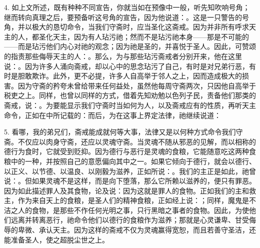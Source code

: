 4. 如上文所述，既有种种不同宣告，你就当如在预像中一般，听先知吹响号角；继而转向真理之后，要预备听这号角的宣告，因为他说道：。这是一只警告的号角，并以极大的恳切命令，当我们守斋时，应当圣化这斋戒。因为并非所有呼求天主的人，都圣化天主，因为有人玷污祂；然而不是玷污祂本身——那是不可能的——而是玷污他们内心对祂的观念；因为祂是圣的，并喜悦于圣人。因此，可赞颂的指责那些侮辱天主的人：。那么，为与那些玷污斋戒者分别开来，他在这里说：。因为许多人涌向斋戒，却以心中的思念玷污了自己，有时是对兄弟行恶，有时是胆敢欺诈。此外，更不必提，许多人自高举于邻人之上，因而造成极大的损害。因为守斋的矜夸未曾给带来任何益处，虽然他每周守斋两次，只因他自高举于税吏之上。同样，也曾以同样的方式，借着先知劝勉以色列子民，责备他们那类的斋戒，说：。为要能显示我们守斋时当如何为人，以及斋戒应有的性质，再听天主命令，正如在中所记载的：而后，为在这事上界定法律，祂继续说道：\par

5. 看哪，我的弟兄们，斋戒能成就何等大事，法律又是以何种方式命令我们守斋。不仅应以肉身守斋，还应以灵魂守斋。当灵魂不随从邪恶的见解，而以相称的德行为食时，它就受到贬抑。因为德行与恶行是灵魂的食粮，它能随意吃这两种食粮中的一种，并按照自己的意愿偏向其中之一。如果它倾向于德行，就会以德行、以正义、以节德、以温良、以刚毅为滋养，正如所说：。我们的主正是如此，祂曾说：。但如果灵魂不是这样，而是向下堕落，那么它所赖以滋养的，便只有罪恶。因为如此描述罪人及其食物，论及说：因为这就是罪人的食物。正如我们的主和救主，作为来自天上的食粮，是圣人们的精神食粮，正如经上说：；同样，魔鬼是不洁之人的食物，是那些不作任何光明之事，只行黑暗之事者的食物。因此，为使他们远离并转离恶行，祂命令他们以德行的食粮作为滋养；那就是心灵谦卑、甘受侮辱的卑微、承认天主。因为这样的斋戒不仅为灵魂赢得宽恕，而且若善守圣洁，还能准备圣人，使之超脱尘世之上。\par

